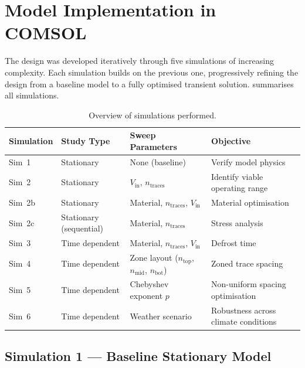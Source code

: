 \chapter{Model Implementation in COMSOL}
\label{ch:implementation}

The design was developed iteratively through five simulations of increasing complexity. Each simulation builds on the previous one, progressively refining the design from a baseline model to a fully optimised transient solution.  summarises all simulations.

\begin{table}[H]
    \centering
    \caption{Overview of simulations performed.}
    \label{tab:sim-overview}
    \begin{tabular}{@{}llll@{}}
        \toprule
        \textbf{Simulation} & \textbf{Study Type} & \textbf{Sweep Parameters} & \textbf{Objective} \\
        \midrule
        Sim~1  & Stationary     & None (baseline)              & Verify model physics \\
        Sim~2  & Stationary     & $V_\text{in}$, $n_\text{traces}$ & Identify viable operating range \\
        Sim~2b & Stationary     & Material, $n_\text{traces}$, $V_\text{in}$ & Material optimisation \\
        Sim~2c & Stationary (sequential) & Material, $n_\text{traces}$ & Stress analysis \\
        Sim~3  & Time dependent & Material, $n_\text{traces}$, $V_\text{in}$ & Defrost time \\
        Sim~4  & Time dependent & Zone layout ($n_\text{top}$, $n_\text{mid}$, $n_\text{bot}$) & Zoned trace spacing \\
        Sim~5  & Time dependent & Chebyshev exponent $p$ & Non-uniform spacing optimisation \\
        Sim~6  & Time dependent & Weather scenario & Robustness across climate conditions \\
        \bottomrule
    \end{tabular}
\end{table}


\section{Simulation 1 --- Baseline Stationary Model}
\label{sec:sim1}

